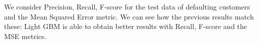 \documentclass[12pt]{article}
\begin{document}
We consider Precision, Recall, F-score for the test data of defaulting customers and the Mean Squared Error metric. We can see how the previous results match these: Light GBM is able to obtain better results with Recall, F-score and the MSE metrics.




\end{document}
